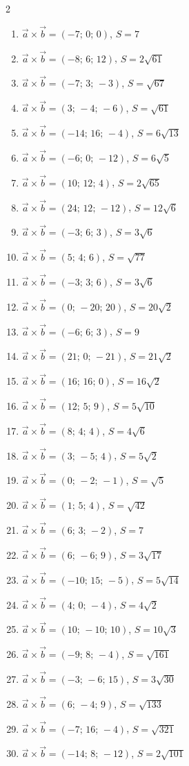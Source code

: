 \begin{multicols}{2}\raggedright
\begin{enumerate}[label=\arabic*., leftmargin=*, itemsep=1pt]
\item $\vec a\times\vec b=(-7;\,0;\,0)$, $S=7$
\item $\vec a\times\vec b=(-8;\,6;\,12)$, $S=2 \sqrt{61}$
\item $\vec a\times\vec b=(-7;\,3;\,-3)$, $S=\sqrt{67}$
\item $\vec a\times\vec b=(3;\,-4;\,-6)$, $S=\sqrt{61}$
\item $\vec a\times\vec b=(-14;\,16;\,-4)$, $S=6 \sqrt{13}$
\item $\vec a\times\vec b=(-6;\,0;\,-12)$, $S=6 \sqrt{5}$
\item $\vec a\times\vec b=(10;\,12;\,4)$, $S=2 \sqrt{65}$
\item $\vec a\times\vec b=(24;\,12;\,-12)$, $S=12 \sqrt{6}$
\item $\vec a\times\vec b=(-3;\,6;\,3)$, $S=3 \sqrt{6}$
\item $\vec a\times\vec b=(5;\,4;\,6)$, $S=\sqrt{77}$
\item $\vec a\times\vec b=(-3;\,3;\,6)$, $S=3 \sqrt{6}$
\item $\vec a\times\vec b=(0;\,-20;\,20)$, $S=20 \sqrt{2}$
\item $\vec a\times\vec b=(-6;\,6;\,3)$, $S=9$
\item $\vec a\times\vec b=(21;\,0;\,-21)$, $S=21 \sqrt{2}$
\item $\vec a\times\vec b=(16;\,16;\,0)$, $S=16 \sqrt{2}$
\item $\vec a\times\vec b=(12;\,5;\,9)$, $S=5 \sqrt{10}$
\item $\vec a\times\vec b=(8;\,4;\,4)$, $S=4 \sqrt{6}$
\item $\vec a\times\vec b=(3;\,-5;\,4)$, $S=5 \sqrt{2}$
\item $\vec a\times\vec b=(0;\,-2;\,-1)$, $S=\sqrt{5}$
\item $\vec a\times\vec b=(1;\,5;\,4)$, $S=\sqrt{42}$
\item $\vec a\times\vec b=(6;\,3;\,-2)$, $S=7$
\item $\vec a\times\vec b=(6;\,-6;\,9)$, $S=3 \sqrt{17}$
\item $\vec a\times\vec b=(-10;\,15;\,-5)$, $S=5 \sqrt{14}$
\item $\vec a\times\vec b=(4;\,0;\,-4)$, $S=4 \sqrt{2}$
\item $\vec a\times\vec b=(10;\,-10;\,10)$, $S=10 \sqrt{3}$
\item $\vec a\times\vec b=(-9;\,8;\,-4)$, $S=\sqrt{161}$
\item $\vec a\times\vec b=(-3;\,-6;\,15)$, $S=3 \sqrt{30}$
\item $\vec a\times\vec b=(6;\,-4;\,9)$, $S=\sqrt{133}$
\item $\vec a\times\vec b=(-7;\,16;\,-4)$, $S=\sqrt{321}$
\item $\vec a\times\vec b=(-14;\,8;\,-12)$, $S=2 \sqrt{101}$
\end{enumerate}
\end{multicols}
